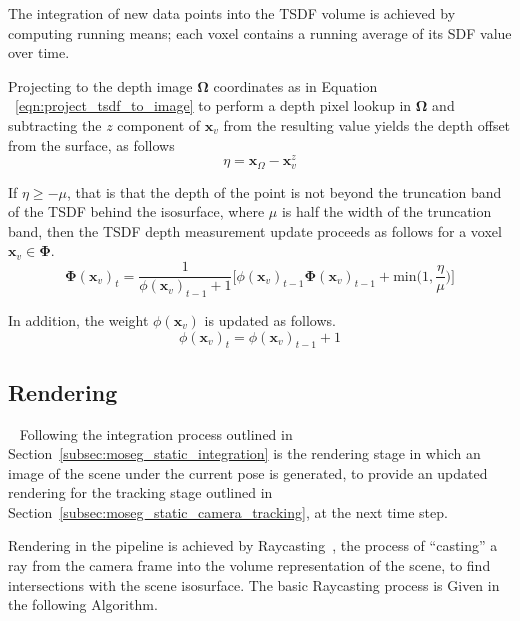The integration of new data points into the TSDF volume is achieved by computing 
running means; each voxel contains a running average of its SDF value over time.

Projecting to the depth image \(\bm{\Omega}\) coordinates as in Equation
~\ref{eqn:project_tsdf_to_image} to perform a depth pixel lookup in \(\bm{\Omega}\)
and subtracting the \(z\) component of \(\bm{x}_{v}\) from the resulting value
yields the depth offset from the surface, as follows
\begin{equation}
  \label{eqn:integration_offset}
  \eta = \bm{x}_{\Omega} - \bm{x}_{v}^{z}
\end{equation}

If \( \eta \geq -\mu \), that is that the depth of the point is not beyond the
truncation band of the TSDF behind the isosurface, where \( \mu \) is half the 
width of the truncation band, then the TSDF depth measurement update 
proceeds as follows for a voxel \(\bm{x}_{v} \in \bm{\Phi}\).
\begin{equation}
\label{eqn:sdf_update}
\bm{\Phi}{(\bm{x}_{v})}_{t} = \frac{1}{\phi{(\bm{x}_{v})}_{t-1} + 1}
\bigg[\phi{(\bm{x}_{v})}_{t-1}\bm{\bm{\Phi}}{(\bm{x}_{v})}_{t-1} +
\text{min} \bigg( 1, \frac{\eta}{\mu} \bigg)
\bigg]
\end{equation}

In addition, the weight \(\phi(\bm{x}_{v})\) is updated as follows.
\begin{equation}
  \label{eqn:sdf_weight_update}
  \phi{(\bm{x}_{v})}_{t} = \phi{(\bm{x}_{v})}_{t-1} + 1
\end{equation}

\subsection{Rendering}
~\label{subsec:moseg_static_rendering}
Following the integration process outlined in Section~\ref{subsec:moseg_static_integration} 
is the rendering stage in which an image of the scene under the current pose is generated, to 
provide an updated rendering for the tracking stage outlined in Section~\ref{subsec:moseg_static_camera_tracking}, 
at the next time step.

Rendering in the pipeline is achieved by Raycasting~\cite{Roth1982}, the process of 
``casting'' a ray from the camera frame into the volume representation of the scene, to find intersections with 
the scene isosurface. The basic Raycasting process is Given in the following Algorithm.

